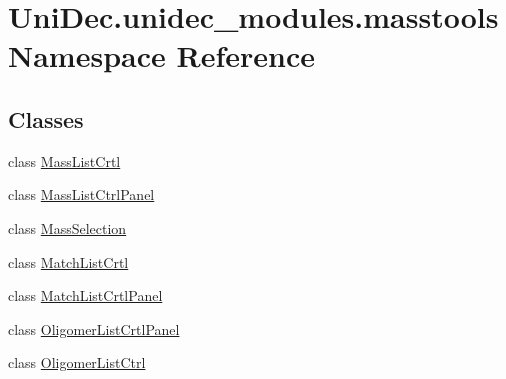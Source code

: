 \hypertarget{namespace_uni_dec_1_1unidec__modules_1_1masstools}{}\section{Uni\+Dec.\+unidec\+\_\+modules.\+masstools Namespace Reference}
\label{namespace_uni_dec_1_1unidec__modules_1_1masstools}
\subsection*{Classes}
\begin{DoxyCompactItemize}
\item 
class \hyperlink{class_uni_dec_1_1unidec__modules_1_1masstools_1_1_mass_list_crtl}{Mass\+List\+Crtl}
\item 
class \hyperlink{class_uni_dec_1_1unidec__modules_1_1masstools_1_1_mass_list_ctrl_panel}{Mass\+List\+Ctrl\+Panel}
\item 
class \hyperlink{class_uni_dec_1_1unidec__modules_1_1masstools_1_1_mass_selection}{Mass\+Selection}
\item 
class \hyperlink{class_uni_dec_1_1unidec__modules_1_1masstools_1_1_match_list_crtl}{Match\+List\+Crtl}
\item 
class \hyperlink{class_uni_dec_1_1unidec__modules_1_1masstools_1_1_match_list_crtl_panel}{Match\+List\+Crtl\+Panel}
\item 
class \hyperlink{class_uni_dec_1_1unidec__modules_1_1masstools_1_1_oligomer_list_crtl_panel}{Oligomer\+List\+Crtl\+Panel}
\item 
class \hyperlink{class_uni_dec_1_1unidec__modules_1_1masstools_1_1_oligomer_list_ctrl}{Oligomer\+List\+Ctrl}
\end{DoxyCompactItemize}
